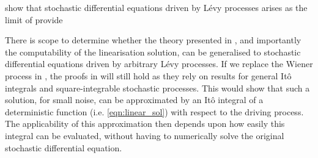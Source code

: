 \citet{GottwaldMelbourne_2013_HomogenizationDeterministicMaps} show that stochastic differential equations driven by L\'evy processes arises as the limit of 
\citet{PenlandEwald_2008_ModellingPhysicalSystems} provide 

There is scope to determine whether the theory presented in , and importantly the computability of the linearisation solution, can be generalised to stochastic differential equations driven by arbitrary L\'evy processes.
If we replace the Wiener process in , the proofs in  will still hold as they rely on results for general It\^o integrals and square-integrable stochastic processes.
This would show that such a solution, for small noise, can be approximated by an It\^o integral of a deterministic function (i.e. \cref{eqn:linear_sol}) with respect to the driving process.
The applicability of this approximation then depends upon how easily this integral can be evaluated, without having to numerically solve the original stochastic differential equation.



